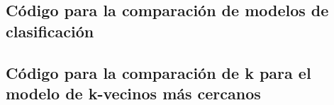 \documentclass[sigconf,authorversion,nonacm]{acmart}
\begin{document}



\clearpage

\appendix

\lstset{style=customstyle}

\begin{figure*}
  \section{Código para la comparación de modelos de clasificación}
  \label{appendix:py}
  
\end{figure*}

\begin{figure*}
  
\end{figure*}

\begin{figure*}
  \section{Código para la comparación de k para el modelo de k-vecinos más cercanos}
  \label{appendix:knnpy}
  
\end{figure*}
\end{document}
